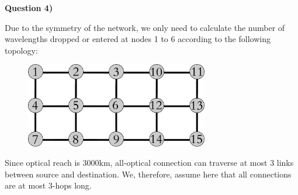\documentclass[10pt,letterpaper]{article}
\newcommand{\Q}[1]{\textbf{Question #1)}}
\begin{document}
\Q4

Due to the symmetry of the network, we only need to calculate the number of wavelengths dropped or entered at nodes 1 to 6 according to the following topology:
\begin{figure}[h]
\centering
\includegraphics[width=80mm]{PS1_Net_num}
\end{figure}
Since optical reach is 3000km, all-optical connection can traverse at most 3 links between source and destination. We, therefore, assume here that all connections are at most 3-hops long.
\end{document}
